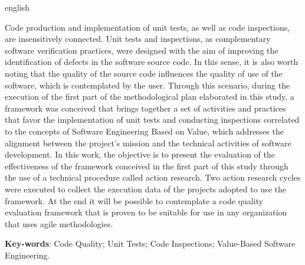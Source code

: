 \begin{resumo}[Abstract]
 \begin{otherlanguage*}{english}

   Code production and implementation of unit tests, as well as code inspections, are insensitively connected. Unit tests and inspections, as complementary software verification practices, were designed with the aim of improving the identification of defects in the software source code. In this sense, it is also worth noting that the quality of the source code influences the quality of use of the software, which is contemplated by the user. Through this scenario, during the execution of the first part of the methodological plan elaborated in this study, a framework was conceived that brings together a set of activities and practices that favor the implementation of unit tests and conducting inspections correlated to the concepts of Software Engineering Based on Value, which addresses the alignment between the project's mission and the technical activities of software development. In this work, the objective is to present the evaluation of the effectiveness of the framework conceived in the first part of this study through the use of a technical procedure called action research. Two action research cycles were executed to collect the execution data of the projects adopted to use the framework. At the end it will be possible to contemplate a code quality evaluation framework that is proven to be suitable for use in any organization that uses agile methodologies.

   \vspace{\onelineskip}
 
   \noindent 
   \textbf{Key-words}: Code Quality; Unit Tests; Code Inspections; Value-Based Software Engineering.
 \end{otherlanguage*}
\end{resumo}
